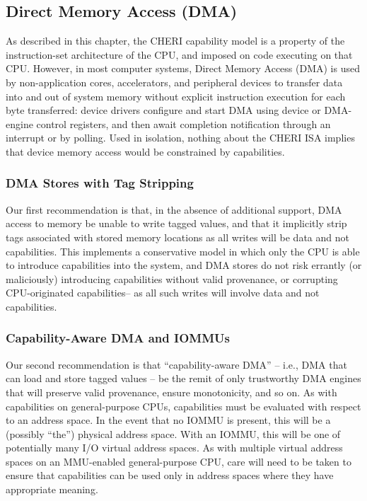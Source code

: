 \subsection{Direct Memory Access (DMA)}
\label{sec:dma}

As described in this chapter, the CHERI capability model is a property of the
instruction-set architecture of the CPU, and imposed on code executing on that
CPU.
However, in most computer systems, Direct Memory Access (DMA) is used by
non-application cores, accelerators, and peripheral devices to transfer data
into and out of system memory without explicit instruction execution for each
byte transferred: device drivers configure and start DMA using device or
DMA-engine control registers, and then await completion notification through
an interrupt or by polling.
Used in isolation, nothing about the CHERI ISA implies that device memory
access would be constrained by capabilities.

\subsubsection{DMA Stores with Tag Stripping}

Our first recommendation is that, in the absence of additional support, DMA
access to memory be unable to write tagged values, and that it implicitly
strip tags associated with stored memory locations as all writes will be data
and not capabilities.
This implements a conservative model in which only the CPU is able to
introduce capabilities into the system, and DMA stores do not risk errantly
(or maliciously) introducing capabilities without valid provenance, or
corrupting CPU-originated capabilities-- as all such writes will involve data and
not capabilities.

\subsubsection{Capability-Aware DMA and IOMMUs}

Our second recommendation is that ``capability-aware DMA'' -- i.e., DMA that
can load and store tagged values -- be the remit of only trustworthy DMA
engines that will preserve valid provenance, ensure monotonicity, and so on.
As with capabilities on general-purpose CPUs, capabilities must be evaluated
with respect to an address space.
In the event that no IOMMU is present, this will be a (possibly ``the'')
physical address space.
With an IOMMU, this will be one of potentially many I/O virtual address
spaces.
As with multiple virtual address spaces on an MMU-enabled general-purpose CPU,
care will need to be taken to ensure that capabilities can be used only in
address spaces where they have appropriate meaning.

